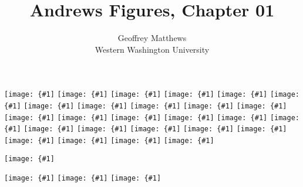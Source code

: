 \documentclass{article}
\title{Andrews Figures, Chapter 01}
\author{Geoffrey Matthews\\
\small Western Washington University}
\newcommand{\myfig}[1]
{\hspace{-1.5in}\texttt{[image: \{\#1]}}\newpage}
\newcommand{\myfigbig}[1]
{\hspace{-1.0in}\texttt{[image: \{\#1]}}\newpage}
\newcommand{\myfigbigbig}[1]
{\hspace{-1.0in}\texttt{[image: \{\#1]}}\newpage}
\begin{document}
\maketitle

\myfig{chap07/000_II_1.pdf}
\myfig{chap07/7_01.pdf}
\myfig{chap07/7_02.pdf}
\myfig{chap07/7_03.pdf}
\myfig{chap07/7_04.pdf}
\myfig{chap07/7_05.pdf}
\myfig{chap07/7_06.pdf}
\myfigbig{chap07/7_07.pdf}
\myfig{chap07/table7_1.pdf}
\myfig{chap07/7_08.pdf}
\myfig{chap07/7_09.pdf}
\myfigbig{chap07/7_10.pdf}
\myfig{chap07/7_11.pdf}
\myfig{chap07/7_12.pdf}
\myfig{chap07/7_13.pdf}
\myfig{chap07/7_14.pdf}
\myfig{chap07/p318_pc_synchmp.pdf}
\myfig{chap07/p320_exchange_synchmp.pdf}
\myfig{chap07/p322_GCD_csp.pdf}
\myfig{chap07/p324_copy_csp.pdf}
\myfig{chap07/p325_allocator_csp.pdf}
\myfig{chap07/p326_exchange_csp.pdf}
\myfig{chap07/7_15.pdf}
\myfig{chap07/p330_pc_occam.pdf}
\myfig{chap07/p331_copy_occam.pdf}
\myfig{chap07/p333_modernCSP.pdf}


\myfigbigbig{chap07/7_16.pdf}

\myfig{chap07/7_17.pdf}
\myfigbig{chap07/7_18.pdf}
\myfig{chap07/7_19.pdf}
\end{document}

